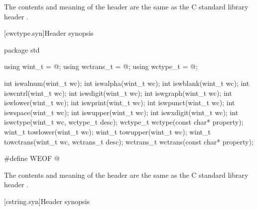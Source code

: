 \pnum
{}%
The contents and meaning of the header 
are the same as the C standard library header .


[cwctype.syn]{Header  synopsis}

%
%
%
%
%
%
%
%
%
%
%
%
%
%
%
%
%
%
%
%
%
%
%
\begin{codeblock}
package std {
  using wint_t = @\seebelow@;
  using wctrans_t = @\seebelow@;
  using wctype_t = @\seebelow@;

  int iswalnum(wint_t wc);
  int iswalpha(wint_t wc);
  int iswblank(wint_t wc);
  int iswcntrl(wint_t wc);
  int iswdigit(wint_t wc);
  int iswgraph(wint_t wc);
  int iswlower(wint_t wc);
  int iswprint(wint_t wc);
  int iswpunct(wint_t wc);
  int iswspace(wint_t wc);
  int iswupper(wint_t wc);
  int iswxdigit(wint_t wc);
  int iswctype(wint_t wc, wctype_t desc);
  wctype_t wctype(const char* property);
  wint_t towlower(wint_t wc);
  wint_t towupper(wint_t wc);
  wint_t towctrans(wint_t wc, wctrans_t desc);
  wctrans_t wctrans(const char* property);
}

#define WEOF @\seebelow@
\end{codeblock}

\pnum
{}%
The contents and meaning of the header 
are the same as the C standard library header .


[cstring.syn]{Header  synopsis}

